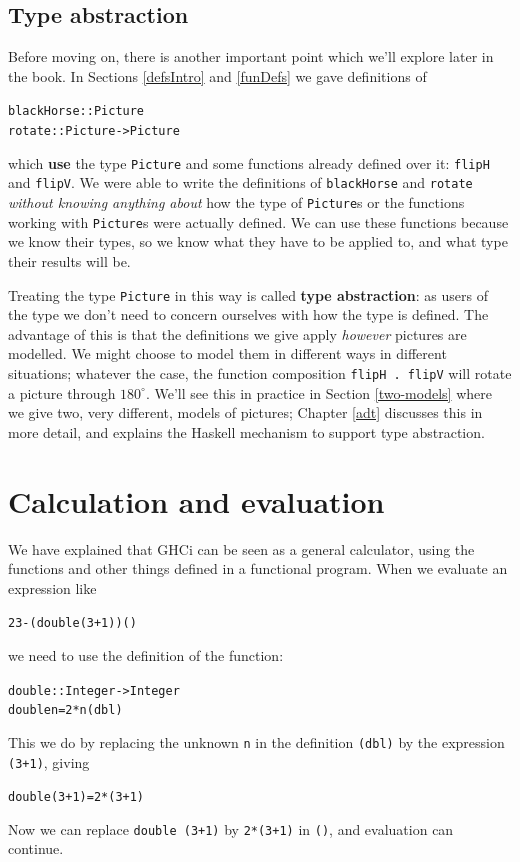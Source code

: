 \subsection*{Type abstraction}

Before moving on, there is another important point which we'll
explore later in the book. In Sections \ref{defsIntro} and \ref{funDefs}
we gave definitions of
\begin{alltt}
blackHorse :: Picture
rotate     :: Picture -> Picture
\end{alltt}
which \textbf{use} the type \texttt{Picture} and some functions already defined
over it: \texttt{flipH} and \texttt{flipV}. We were able to
write the definitions of
\texttt{blackHorse} and \texttt{rotate} {\em without
knowing anything about\/} how the type of \texttt{Picture}s or the functions working with \texttt{Picture}s were actually defined. We can use these functions because we know their types, so we know what they have to be applied to, and what type their results will be.

Treating the type \texttt{Picture} in this way is called
\textbf{type abstraction}:
as users of the type we don't need to concern ourselves with how the type is
defined. The advantage of this is that the definitions we give apply {\em
however\/} pictures are modelled. We might choose to model them in
different ways in different situations; whatever the case, the function
composition
\texttt{flipH .\ flipV} will rotate a
picture through $180^\circ$. We'll see this in practice in Section \ref{two-models} where we give two, very different, models of pictures; 
Chapter \ref{adt} discusses this in more
detail, and explains the Haskell mechanism to support type abstraction.



\section{Calculation and evaluation}

We have explained that GHCi can be seen as a general calculator, using
the functions and other things defined in a functional program. When we
evaluate an expression like
\begin{alltt}
23 - (double (3+1))\hfill(\ddag)
\end{alltt} 
we need to use the definition of the function:
\begin{alltt}
double :: Integer -> Integer
double n = 2*n\hfill(dbl)
\end{alltt}
This we do by replacing the unknown \texttt{n} in the definition
\texttt{(dbl)} by the
expression \texttt{(3+1)}, giving 
\begin{alltt}
double (3+1) = 2*(3+1)
\end{alltt}
Now we can replace \texttt{double (3+1)} by \texttt{2*(3+1)} in \texttt{(\ddag)}, and
evaluation can continue.

